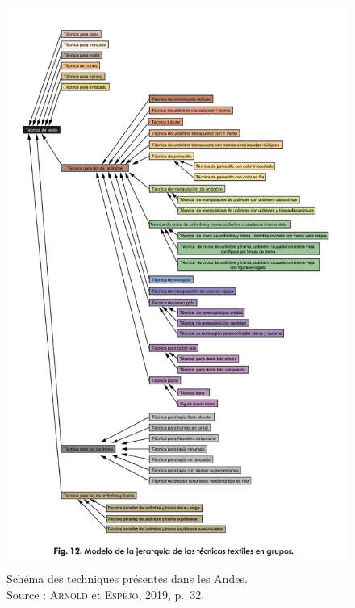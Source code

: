 \documentclass[a4paper, twoside, 12pt]{book}
\begin{document}
\begin{figure}[!h]
    \centering
    \includegraphics[width=15cm]{images/techniqueArnold32.png}
    \caption[Schéma des techniques présentes dans les Andes]{Schéma des techniques présentes dans les Andes. \\Source : A\textsc{rnold} et E\textsc{spejo}, 2019, p.~32.}
    \label{schemaTechniques}
\end{figure}
\end{document}
